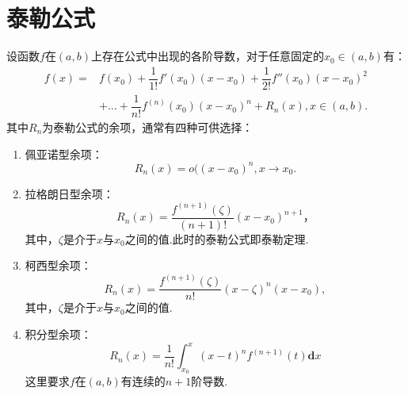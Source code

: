 \section{泰勒公式}

\begin{theorem}[泰勒公式]
	设函数$f$在$(a,b)$上存在公式中出现的各阶导数，对于任意固定的$x_0\in(a,b)$有：
	\begin{equation}
		\begin{split}
			f(x) = & f(x_0)+\dfrac{1}{1!}f'(x_0)(x-x_0)+\dfrac{1}{2!}f''(x_0)(x-x_0)^2 \\ & +\dots+\dfrac{1}{n!}f^{(n)}(x_0)(x-x_0)^n+R_n(x),x\in(a,b).
			\end{split}
	\end{equation}
	其中$R_n$为泰勒公式的余项，通常有四种可供选择：
	\begin{enumerate}
		\item 佩亚诺型余项：
		\begin{equation}
			R_n(x)=o((x-x_0)^n,x\rightarrow x_0.
		\end{equation}
		\item 拉格朗日型余项：
		\begin{equation}
			R_n(x)=\dfrac{f^{(n+1)}(\zeta)}{(n+1)!}(x-x_0)^{n+1}，
		\end{equation}
		其中，$\zeta$是介于$x$与$x_0$之间的值.此时的泰勒公式即泰勒定理.
		\item 柯西型余项：
		\begin{equation}
			R_n(x)=\dfrac{f^{(n+1)}(\zeta)}{n!}(x-\zeta)^n(x-x_0),
		\end{equation}
		其中，$\zeta$是介于$x$与$x_0$之间的值.
		\item 积分型余项：
		\begin{equation}
			R_n(x)=\dfrac{1}{n!}\int_{x_0}^{x}(x-t)^nf^{(n+1)}(t)\textbf{d}x
		\end{equation}
		这里要求$f$在$(a,b)$有连续的$n+1$阶导数.
	\end{enumerate}
\end{theorem}